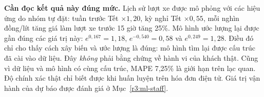{\textbf{Cần đọc kết quả này đúng mức.} Lịch sử lượt xe được mô phỏng với các
hiệu ứng do nhóm tự đặt: tuần trước Tết $\times1{,}20$, kỳ nghỉ Tết
$\times0{,}55$, mỗi nghìn đồng/lít tăng giá làm lượt xe trước 15 giờ tăng 25\%.
Mô hình ước lượng lại được gần đúng các giá trị này: $e^{0{,}167}=1{,}18$,
$e^{-0{,}540}=0{,}58$ và $e^{0{,}249}=1{,}28$. Điều đó chỉ cho thấy cách xây
biến và ước lượng là đúng: mô hình tìm lại được cấu trúc đã cài vào dữ liệu.
Đây \emph{không} phải bằng chứng về hành vi của khách thật. Cũng vì dữ liệu và
mô hình có cùng cấu trúc, MAPE 7,25\% là giới hạn trên lạc quan. Độ chính xác
thật chỉ biết được khi huấn luyện trên hóa đơn điện tử.
Giá trị vận hành của dự báo được đánh giá ở Mục~\ref{r3:ml-staff}.

}
